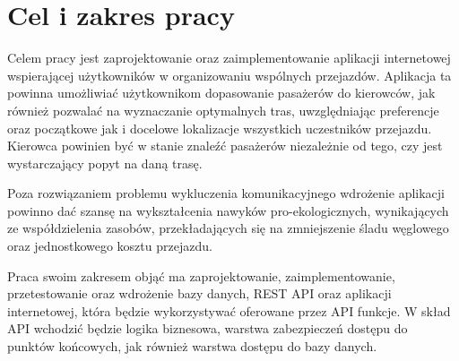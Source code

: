 \section{Cel i zakres pracy}
Celem pracy jest zaprojektowanie oraz zaimplementowanie aplikacji internetowej wspierającej użytkowników w organizowaniu wspólnych przejazdów. 
Aplikacja ta powinna umożliwiać użytkownikom dopasowanie pasażerów do kierowców, jak również pozwalać na wyznaczanie optymalnych tras, 
uwzględniając preferencje oraz początkowe jak i docelowe lokalizacje wszystkich uczestników przejazdu.
Kierowca powinien być w stanie znaleźć pasażerów niezależnie od tego, czy jest wystarczający popyt na daną trasę.

Poza rozwiązaniem problemu wykluczenia komunikacyjnego wdrożenie aplikacji powinno dać szansę na wykształcenia nawyków pro-ekologicznych, 
wynikających ze współdzielenia zasobów, przekładających się na zmniejszenie śladu węglowego oraz jednostkowego kosztu przejazdu.


Praca swoim zakresem objąć ma zaprojektowanie, zaimplementowanie, przetestowanie oraz wdrożenie bazy danych, REST API oraz aplikacji internetowej, która będzie wykorzystywać oferowane przez API funkcje.
W skład API wchodzić będzie logika biznesowa, warstwa zabezpieczeń dostępu do punktów końcowych, jak również warstwa dostępu do bazy danych. 



